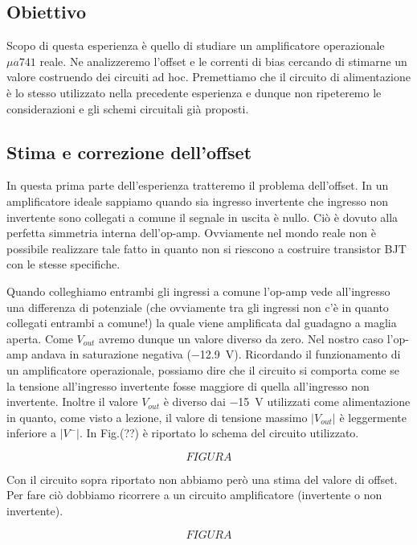 \subsection{Obiettivo}
Scopo di questa esperienza è quello di studiare un amplificatore operazionale $\mu a 741$ reale. Ne analizzeremo l'offset e le correnti di bias cercando di stimarne un valore costruendo dei circuiti ad hoc. Premettiamo che il circuito di alimentazione è lo stesso utilizzato nella precedente esperienza e dunque non ripeteremo le considerazioni e gli schemi circuitali già proposti. 



\subsection{Stima e correzione dell'offset}

In questa prima parte dell'esperienza tratteremo il problema dell'offset. In un amplificatore ideale sappiamo quando sia ingresso invertente che ingresso non invertente sono collegati a comune il segnale in uscita è nullo. Ciò è dovuto alla perfetta simmetria interna dell'op-amp. Ovviamente nel mondo reale non è possibile realizzare tale fatto in quanto non si riescono a costruire transistor BJT con le stesse specifiche. 

Quando colleghiamo entrambi gli ingressi a comune l'op-amp vede all'ingresso una differenza di potenziale (che ovviamente tra gli ingressi non c'è in quanto collegati entrambi a comune!) la quale viene amplificata dal guadagno a maglia aperta. Come $V_{out}$ avremo dunque un valore diverso da zero. Nel nostro caso l'op-amp andava in saturazione negativa (\SI{-12.9}{\volt}). Ricordando il funzionamento di un amplificatore operazionale, possiamo dire che il circuito si comporta come se la tensione all'ingresso invertente fosse maggiore di quella all'ingresso non invertente. Inoltre il valore $V_{out}$ è diverso dai \SI{-15}{\volt} utilizzati come alimentazione in quanto, come visto a lezione, il valore di tensione massimo $|V_{out}|$ è leggermente inferiore a $|V^-|$. In Fig.(??) è riportato lo schema del circuito utilizzato.


$$FIGURA$$



Con il circuito sopra riportato non abbiamo però una stima del valore di offset. Per fare ciò dobbiamo ricorrere a un circuito amplificatore (invertente o non invertente).

$$FIGURA$$


